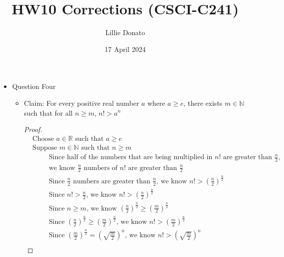 \documentclass{article}
\title{HW10 Corrections (CSCI-C241)}
\author{Lillie Donato}
\date{17 April 2024}
\begin{document}
\maketitle

\begin{itemize}
    \item Question Four
    \begin{itemize}
        \item Claim: For every positive real number $a$ where $a \geq e$, there exists $m \in \mathbb{N}$ such that for all $n \geq m$, $n! > a^n$
        \begin{proof}
            \begin{align}
                &\text{Choose } a \in \mathbb{R} \text{ such that }  a \geq e \\
                &\text{Suppose } m \in \mathbb{N} \text{ such that } n \geq m \\
                &\hspace{1cm} \text{Since half of the numbers that are being multiplied in } n! \text{ are greater than } \frac{n}{2} \text{,} \\
                &\hspace{1cm} \text{we know } \frac{n}{2} \text{ numbers of } n! \text{ are greater than } \frac{n}{2} \nonumber \\
                &\hspace{1cm} \text{Since } \frac{n}{2} \text{ numbers are greater than } \frac{n}{2} \text{, we know } n! > \left (\frac{n}{2}\right )^{\frac{n}{2}} \\
                &\hspace{1cm} \text{Since } n! > \frac{n}{2} \text{, we know } n! > \left (\frac{n}{2} \right )^{\frac{n}{2}} \\
                &\hspace{1cm} \text{Since } n \geq m \text{, we know } \left (\frac{n}{2}\right )^{\frac{n}{2}} \geq \left (\frac{m}{2}\right )^{\frac{n}{2}} \\
                &\hspace{1cm} \text{Since } \left (\frac{n}{2}\right )^{\frac{n}{2}} \geq \left (\frac{m}{2}\right )^{\frac{n}{2}} \text{, we know } n! > \left (\frac{m}{2}\right )^{\frac{n}{2}} \\
                &\hspace{1cm} \text{Since } \left (\frac{m}{2}\right )^{\frac{n}{2}} = \left (\sqrt{\frac{m}{2}}\right )^{n} \text{, we know } n! > \left (\sqrt{\frac{m}{2}}\right )^{n} \\

\end{align}
\end{proof}
\end{itemize}
\end{itemize}
\end{document}
